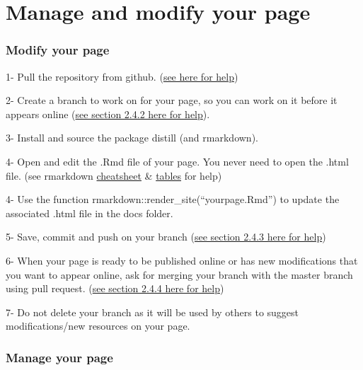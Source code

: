 \documentclass[
]{article}
\begin{document}
\hypertarget{manage-and-modify-your-page}{%
\section{Manage and modify your
page}\label{manage-and-modify-your-page}}

\hypertarget{modify-your-page}{%
\subsubsection{Modify your page}\label{modify-your-page}}

1- Pull the repository from github.
(\href{https://happygitwithr.com/rstudio-git-github.html\#clone-the-test-github-repository-to-your-computer-via-rstudio}{see
here for help})

2- Create a branch to work on for your page, so you can work on it
before it appears online
(\href{https://aberdeenstudygroup.github.io/studyGroup/lessons/SG-T1-GitHubVersionControl/VersionControl/\#2.3.}{see
section 2.4.2 here for help}).

3- Install and source the package distill (and rmarkdown).

4- Open and edit the .Rmd file of your page. You never need to open the
.html file. (see rmarkdown
\href{https://www.rstudio.com/blog/the-r-markdown-cheat-sheet/}{cheatsheet}
\& \href{https://www.markdownguide.org/extended-syntax/\#tables}{tables}
for help)

4- Use the function rmarkdown::render\_site(``yourpage.Rmd'') to update
the associated .html file in the docs folder.

5- Save, commit and push on your branch
(\href{https://aberdeenstudygroup.github.io/studyGroup/lessons/SG-T1-GitHubVersionControl/VersionControl/\#2.3.}{see
section 2.4.3 here for help})

6- When your page is ready to be published online or has new
modifications that you want to appear online, ask for merging your
branch with the master branch using pull request.
(\href{https://aberdeenstudygroup.github.io/studyGroup/lessons/SG-T1-GitHubVersionControl/VersionControl/\#2.3.}{see
section 2.4.4 here for help})

7- Do not delete your branch as it will be used by others to suggest
modifications/new resources on your page.

\hypertarget{manage-your-page}{%
\subsubsection{Manage your page}\label{manage-your-page}}
\end{document}
